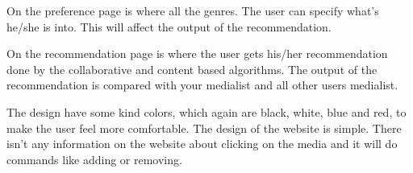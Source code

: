 On the preference page is where all the genres. The user can specify what’s he/she is into. This will affect the output of the recommendation.

On the recommendation page is where the user gets his/her recommendation done by the collaborative and content based algorithms. The output of the recommendation is compared with your medialist and all other users medialist.

The design have some kind colors, which again are black, white, blue and red, to make the user feel more comfortable. The design of the website is simple. There isn't any information on the website about clicking on the media and it will do commands like adding or removing.
